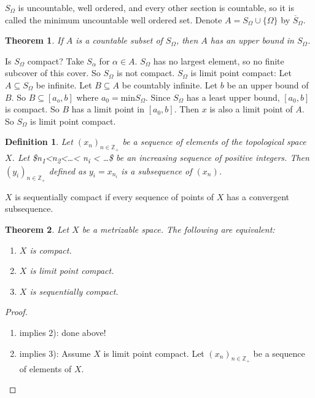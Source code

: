 \documentclass[11pt]{article}
\newtheorem{theorem}{Theorem}[section]
\newtheorem{definition}{Definition}[section]
\begin{document}
\(S_{\Omega}\) is uncountable, well ordered, and every other section is countable,
so it is called the minimum uncountable well ordered set. Denote \(A =
S_{\Omega}\cup\{\Omega\}\) by \(\overline{S}_{\Omega}\). 

\begin{theorem}
If \(A\) is a countable subset of \(S_{\Omega}\), then \(A\) has an upper bound in
\(S_{\Omega}\). 
\end{theorem}

Is \(S_{\Omega}\) compact? Take \(S_{\alpha}\) for \(\alpha\in A\). \(S_{\Omega}\) has
no largest element, so no finite subcover of this cover. So \(S_{\Omega}\) is not
compact. \(S_{\Omega}\) is limit point compact: Let \(A\subseteq S_{\Omega}\) be
infinite. Let \(B\subseteq A\) be countably infinite. Let \(b\) be an upper bound of
\(B\). So \(B\subseteq [a_o, b]\) where \(a_0 = \text{min} S_{\Omega}\). Since
\(S_{\Omega}\) has a least upper bound, \([a_0, b]\) is compact. So \(B\) has a limit
point in \([a_0, b]\). Then \(x\) is also a limit point of \(A\). So \(S_{\Omega}\) is
limit point compact.

\begin{definition}
Let \((x_n)_{n\in \mathbb{Z}_+}\) be a sequence of elements of the topological
space \(X\). Let \$n\textsubscript{1}<n\textsubscript{2}<\ldots < n\textsubscript{i} < \ldots \$ be an increasing sequence of
positive integers. Then \((y_i)_{n\in\mathbb{Z}_+}\) defined as \(y_i = x_{n_i}\)
is a subsequence of \((x_n)\).  
\end{definition}

\(X\) is sequentially compact if every sequence of points of \(X\) has a convergent
subsequence. 

\begin{theorem}
Let \(X\) be a metrizable space. The following are equivalent:

\begin{enumerate}
\item \(X\) is compact.
\item \(X\) is limit point compact.
\item \(X\) is sequentially compact.
\end{enumerate}
\end{theorem}

\begin{proof}
\begin{enumerate}
\item implies 2): done above!

\item implies 3): Assume \(X\) is limit point compact. Let \((x_n)_{n\in\mathbb{Z}_+}\)
be a sequence of elements of \(X\).
\end{enumerate}
\end{proof}
\end{document}
